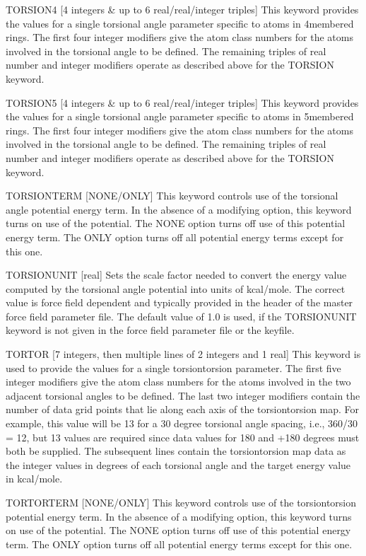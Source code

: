 \documentclass[letterpaper,11pt,english]{sphinxmanual}
\begin{document}
TORSION4 {[}4 integers \& up to 6 real/real/integer triples{]}     This keyword provides the values for a single torsional angle parameter specific to atoms in 4\sphinxhyphen{}membered rings. The first four integer modifiers give the atom class numbers for the atoms involved in the torsional angle to be defined. The remaining triples of real number and integer modifiers operate as described above for the TORSION keyword.

TORSION5 {[}4 integers \& up to 6 real/real/integer triples{]}     This keyword provides the values for a single torsional angle parameter specific to atoms in 5\sphinxhyphen{}membered rings. The first four integer modifiers give the atom class numbers for the atoms involved in the torsional angle to be defined. The remaining triples of real number and integer modifiers operate as described above for the TORSION keyword.

TORSIONTERM {[}NONE/ONLY{]}     This keyword controls use of the torsional angle potential energy term. In the absence of a modifying option, this keyword turns on use of the potential. The NONE option turns off use of this potential energy term. The ONLY option turns off all potential energy terms except for this one.

TORSIONUNIT {[}real{]}     Sets the scale factor needed to convert the energy value computed by the torsional angle potential into units of kcal/mole. The correct value is force field dependent and typically provided in the header of the master force field parameter file. The default value of 1.0 is used, if the TORSIONUNIT keyword is not given in the force field parameter file or the keyfile.

TORTOR {[}7 integers, then multiple lines of 2 integers and 1 real{]}     This keyword is used to provide the values for a single torsion\sphinxhyphen{}torsion parameter. The first five integer modifiers give the atom class numbers for the atoms involved in the two adjacent torsional angles to be defined. The last two integer modifiers contain the number of data grid points that lie along each axis of the torsion\sphinxhyphen{}torsion map. For example, this value will be 13 for a 30 degree torsional angle spacing, i.e., 360/30 = 12, but 13 values are required since data values for \sphinxhyphen{}180 and +180 degrees must both be supplied. The subsequent lines contain the torsion\sphinxhyphen{}torsion map data as the integer values in degrees of each torsional angle and the target energy value in kcal/mole.

TORTORTERM {[}NONE/ONLY{]}     This keyword controls use of the torsion\sphinxhyphen{}torsion potential energy term. In the absence of a modifying option, this keyword turns on use of the potential. The NONE option turns off use of this potential energy term. The ONLY option turns off all potential energy terms except for this one.
\end{document}
